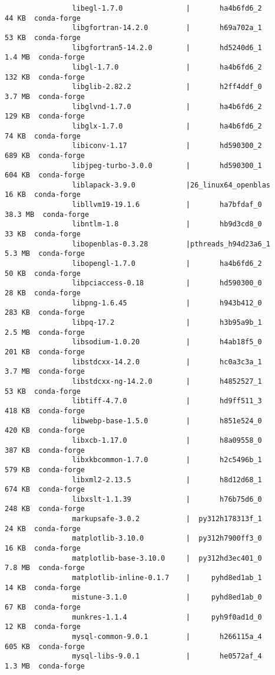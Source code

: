 \documentclass{article}
\begin{document}
\begin{itemize}
\begin{itemize}
\begin{itemize}
\begin{verbatim}
				libegl-1.7.0               |       ha4b6fd6_2          44 KB  conda-forge
				libgfortran-14.2.0         |       h69a702a_1          53 KB  conda-forge
				libgfortran5-14.2.0        |       hd5240d6_1         1.4 MB  conda-forge
				libgl-1.7.0                |       ha4b6fd6_2         132 KB  conda-forge
				libglib-2.82.2             |       h2ff4ddf_0         3.7 MB  conda-forge
				libglvnd-1.7.0             |       ha4b6fd6_2         129 KB  conda-forge
				libglx-1.7.0               |       ha4b6fd6_2          74 KB  conda-forge
				libiconv-1.17              |       hd590300_2         689 KB  conda-forge
				libjpeg-turbo-3.0.0        |       hd590300_1         604 KB  conda-forge
				liblapack-3.9.0            |26_linux64_openblas          16 KB  conda-forge
				libllvm19-19.1.6           |       ha7bfdaf_0        38.3 MB  conda-forge
				libntlm-1.8                |       hb9d3cd8_0          33 KB  conda-forge
				libopenblas-0.3.28         |pthreads_h94d23a6_1         5.3 MB  conda-forge
				libopengl-1.7.0            |       ha4b6fd6_2          50 KB  conda-forge
				libpciaccess-0.18          |       hd590300_0          28 KB  conda-forge
				libpng-1.6.45              |       h943b412_0         283 KB  conda-forge
				libpq-17.2                 |       h3b95a9b_1         2.5 MB  conda-forge
				libsodium-1.0.20           |       h4ab18f5_0         201 KB  conda-forge
				libstdcxx-14.2.0           |       hc0a3c3a_1         3.7 MB  conda-forge
				libstdcxx-ng-14.2.0        |       h4852527_1          53 KB  conda-forge
				libtiff-4.7.0              |       hd9ff511_3         418 KB  conda-forge
				libwebp-base-1.5.0         |       h851e524_0         420 KB  conda-forge
				libxcb-1.17.0              |       h8a09558_0         387 KB  conda-forge
				libxkbcommon-1.7.0         |       h2c5496b_1         579 KB  conda-forge
				libxml2-2.13.5             |       h8d12d68_1         674 KB  conda-forge
				libxslt-1.1.39             |       h76b75d6_0         248 KB  conda-forge
				markupsafe-3.0.2           |  py312h178313f_1          24 KB  conda-forge
				matplotlib-3.10.0          |  py312h7900ff3_0          16 KB  conda-forge
				matplotlib-base-3.10.0     |  py312hd3ec401_0         7.8 MB  conda-forge
				matplotlib-inline-0.1.7    |     pyhd8ed1ab_1          14 KB  conda-forge
				mistune-3.1.0              |     pyhd8ed1ab_0          67 KB  conda-forge
				munkres-1.1.4              |     pyh9f0ad1d_0          12 KB  conda-forge
				mysql-common-9.0.1         |       h266115a_4         605 KB  conda-forge
				mysql-libs-9.0.1           |       he0572af_4         1.3 MB  conda-forge

\end{verbatim}
\end{itemize}
\end{itemize}
\end{itemize}
\end{document}
